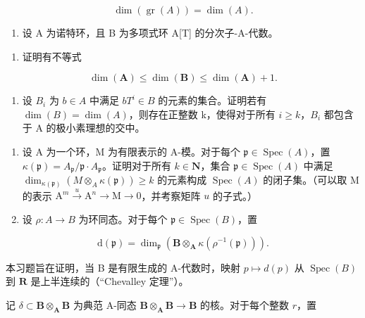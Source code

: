\[
\dim (\operatorname{gr} (A)) = \dim (A).
\]

\begin{enumerate}
\def\labelenumi{\arabic{enumi})}
\setcounter{enumi}{7}
\tightlist
\item
  设 A 为诺特环，且 B 为多项式环 A{[}T{]} 的分次子-A-代数。
\end{enumerate}

\begin{enumerate}
\def\labelenumi{\alph{enumi})}
\tightlist
\item
  证明有不等式
\end{enumerate}

\[
\dim (\mathbf {A}) \leqslant \dim (\mathbf {B}) \leqslant \dim (\mathbf {A}) + 1.
\]

\begin{enumerate}
\def\labelenumi{\alph{enumi})}
\setcounter{enumi}{1}
\tightlist
\item
  设 \(B_{i}\) 为 \(b \in A\) 中满足 \(bT^{i} \in B\) 的元素的集合。证明若有 \(\dim(B) = \dim(A)\)，则存在正整数 k，使得对于所有 \(i \geqslant k\)，\(B_{i}\) 都包含于 A 的极小素理想的交中。
\end{enumerate}

\begin{enumerate}
\def\labelenumi{\arabic{enumi})}
\setcounter{enumi}{8}
\item
  设 A 为一个环，M 为有限表示的 A-模。对于每个 \(\mathfrak{p} \in \operatorname{Spec}(A)\)，置 \(\kappa(\mathfrak{p}) = A_{\mathfrak{p}} / \mathfrak{p} \cdot A_{\mathfrak{p}}\)。证明对于所有 \(k \in \mathbf{N}\)，集合 \(\mathfrak{p} \in \operatorname{Spec}(A)\) 中满足 \(\dim_{\kappa(\mathfrak{p})} (M \otimes_A \kappa(\mathfrak{p})) \geqslant k\) 的元素构成 \(\operatorname{Spec}(A)\) 的闭子集。（可以取 M 的表示 \(\mathrm{A}^m \xrightarrow{u} \mathrm{A}^n \longrightarrow \mathrm{M} \longrightarrow 0\)，并考察矩阵 \(u\) 的子式。）
\item
  设 \(\rho: A \to B\) 为环同态。对于每个 \(\mathfrak{p} \in \operatorname{Spec}(B)\)，置
\end{enumerate}

\[
\mathrm{d} (\mathfrak {p}) = \dim_ {\mathfrak {p}} \left(\mathbf {B} \otimes_ {\mathbf {A}} \kappa \left(\rho^ {- 1} (\mathfrak {p})\right)\right).
\]

  本习题旨在证明，当 B 是有限生成的 A-代数时，映射 \(p \mapsto d(p)\) 从 \(\operatorname{Spec}(B)\) 到 \(\mathbf{R}\) 是上半连续的（“Chevalley 定理”）。

记 \(\delta \subset \mathbf{B} \otimes_{\mathbf{A}} \mathbf{B}\) 为典范 A-同态 \(\mathbf{B} \otimes_{\mathbf{A}} \mathbf{B} \to \mathbf{B}\) 的核。对于每个整数 \(r\)，置


